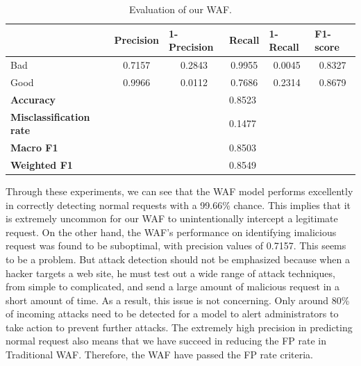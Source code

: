 \begin{table}[h!]
	\begin{tabular}{llllll}
	\hline
	\textbf{}                       & \textbf{Precision}         & \textbf{1-Precision}       & \textbf{Recall}            & \textbf{1-Recall}          & \textbf{F1-score}          \\ \hline
	Bad                             & \multicolumn{1}{c}{0.7157} & \multicolumn{1}{c}{0.2843} & \multicolumn{1}{c}{0.9955} & \multicolumn{1}{c}{0.0045} & \multicolumn{1}{c}{0.8327} \\
	Good                            & \multicolumn{1}{c}{0.9966} & \multicolumn{1}{c}{0.0112} & \multicolumn{1}{c}{0.7686} & \multicolumn{1}{c}{0.2314} & \multicolumn{1}{c}{0.8679} \\ \hline
	\textbf{Accuracy}               &                            &                            & 0.8523                     &                            &                            \\
	\textbf{Misclassification rate} &                            &                            & 0.1477                     &                            &                            \\
	\textbf{Macro F1}               &                            &                            & 0.8503                     &                            &                            \\
	\textbf{Weighted F1}            &                            &                            & 0.8549                     &                            &                            \\ \hline
	\end{tabular}
	\caption{\label{demo-table} Evaluation of our WAF.}
	\end{table}
	\newpage
	Through these experiments, we can see that the WAF model performs excellently in correctly detecting normal requests with a 99.66\% chance. This implies that it is extremely uncommon for our WAF to unintentionally intercept a legitimate request. On the other hand, the WAF's performance on identifying imalicious request was found to be suboptimal, with precision values of 0.7157. This seems to be a problem. But attack detection should not be emphasized because when a hacker targets a web site, he must test out a wide range of attack techniques, from simple to complicated, and send a large amount of malicious request in a short amount of time. As a result, this issue is not concerning. Only around 80\% of incoming attacks need to be detected for a model to alert administrators to take action to prevent further attacks. The extremely high precision in predicting normal request also means that we have succeed in reducing the FP rate in Traditional WAF. Therefore, the WAF have passed the FP rate criteria. 
